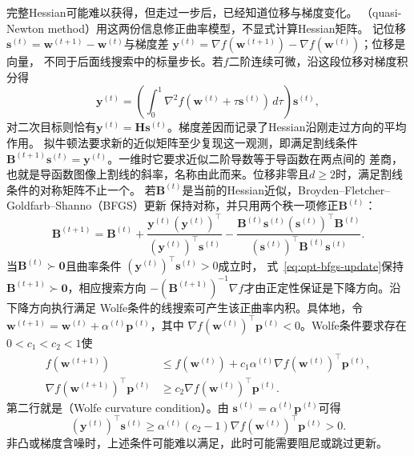 完整Hessian可能难以获得，但走过一步后，已经知道位移与梯度变化。
（quasi-Newton method）用这两份信息修正曲率模型，不显式计算Hessian矩阵。
记位移$\bm{s}^{(t)}=\bm{w}^{(t+1)}-\bm{w}^{(t)}$与梯度差
$\bm{y}^{(t)}=\nabla f(\bm{w}^{(t+1)})-\nabla f(\bm{w}^{(t)})$；位移是向量，
不同于后面线搜索中的标量步长。若$f$二阶连续可微，沿这段位移对梯度积分得
\[
 \bm y^{(t)}=\left(\int_0^1\nabla^2f(\bm w^{(t)}+\tau\bm s^{(t)})\,d\tau\right)\bm s^{(t)},
\]
对二次目标则恰有$\bm y^{(t)}=\bm H\bm s^{(t)}$。梯度差因而记录了Hessian沿刚走过方向的平均作用。
拟牛顿法要求新的近似矩阵至少复现这一观测，即满足割线条件
$\bm{B}^{(t+1)}\bm{s}^{(t)}=\bm{y}^{(t)}$。一维时它要求近似二阶导数等于导函数在两点间的
差商，也就是导函数图像上割线的斜率，名称由此而来。位移非零且$d\geq2$时，满足割线条件的对称矩阵不止一个。
若$\bm{B}^{(t)}$是当前的Hessian近似，Broyden--Fletcher--Goldfarb--Shanno（BFGS）更新
保持对称，并只用两个秩一项修正$\bm B^{(t)}$：
\begin{equation}
  \bm{B}^{(t+1)}
  =
  \bm{B}^{(t)}
  +
  \frac{\bm{y}^{(t)}(\bm{y}^{(t)})^{\top}}
       {(\bm{y}^{(t)})^{\top}\bm{s}^{(t)}}
  -
  \frac{\bm{B}^{(t)}\bm{s}^{(t)}(\bm{s}^{(t)})^{\top}\bm{B}^{(t)}}
       {(\bm{s}^{(t)})^{\top}\bm{B}^{(t)}\bm{s}^{(t)}}.
  \label{eq:opt-bfgs-update}
\end{equation}
当$\bm{B}^{(t)}\succ\bm{0}$且曲率条件
$(\bm{y}^{(t)})^{\top}\bm{s}^{(t)}>0$成立时，
式~\eqref{eq:opt-bfgs-update}保持$\bm{B}^{(t+1)}\succ\bm{0}$，相应搜索方向
$-(\bm{B}^{(t+1)})^{-1}\nabla f$才由正定性保证是下降方向。沿下降方向执行满足
Wolfe条件的线搜索可产生该正曲率内积。具体地，令
$\bm{w}^{(t+1)}=\bm{w}^{(t)}+\alpha^{(t)}\bm{p}^{(t)}$，其中
$\nabla f(\bm{w}^{(t)})^{\top}\bm{p}^{(t)}<0$。Wolfe条件要求存在
$0<c_1<c_2<1$使
\begin{equation}
\begin{aligned}
  f(\bm{w}^{(t+1)})
  &\leq
  f(\bm{w}^{(t)})
  +
  c_1\alpha^{(t)}
  \nabla f(\bm{w}^{(t)})^{\top}\bm{p}^{(t)},\\
  \nabla f(\bm{w}^{(t+1)})^{\top}\bm{p}^{(t)}
  &\geq
  c_2\nabla f(\bm{w}^{(t)})^{\top}\bm{p}^{(t)}.
\end{aligned}
\label{eq:opt-wolfe-conditions}
\end{equation}
第二行就是（Wolfe curvature condition）。由
$\bm{s}^{(t)}=\alpha^{(t)}\bm{p}^{(t)}$可得
\[
  (\bm{y}^{(t)})^{\top}\bm{s}^{(t)}
  \geq
  \alpha^{(t)}(c_2-1)
  \nabla f(\bm{w}^{(t)})^{\top}\bm{p}^{(t)}
  >0.
\]
非凸或梯度含噪时，上述条件可能难以满足，此时可能需要阻尼或跳过更新。

